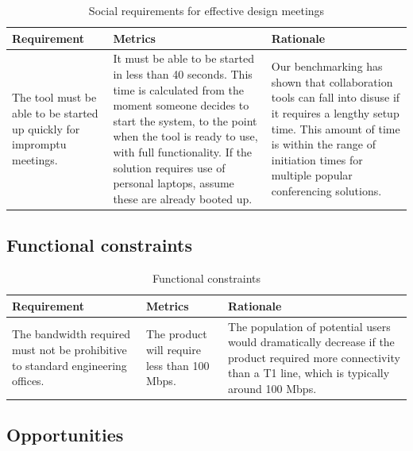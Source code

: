 \begin{table}[!h]
	\centering
		\begin{tabular}{| p{42mm} | p{42mm} | p{51mm} |}
		\hline
		\textbf{Requirement}	& \textbf{Metrics} & \textbf{Rationale} \\
		\hline
The tool must be able to be started up quickly for impromptu meetings.	& It must be able to be started in less than 40 seconds. This time is calculated from the moment someone decides to start the system, to the point when the tool is ready to use, with full functionality. If the solution requires use of personal laptops, assume these are already booted up. & Our benchmarking has shown that collaboration tools can fall into disuse if it requires a lengthy setup time. This amount of time is within the range of initiation times for multiple popular conferencing solutions. \\ \hline

	\end{tabular}
	\caption{Social requirements for effective design meetings}
	\label{tab:mediums3}
\end{table}



\newpage

\subsection{Functional constraints}

\begin{table}[!h]
	\centering
		\begin{tabular}{| p{44mm} | p{49mm} | p{42mm} |}
		\hline
		\textbf{Requirement}	& \textbf{Metrics} & \textbf{Rationale} \\
		\hline
		The bandwidth required must not be prohibitive to standard engineering offices.	& The product will require less than 100 Mbps.& The population of potential users would dramatically decrease if the product required more connectivity than a T1 line, which is typically around 100 Mbps.\\ \hline
			\end{tabular}
	\caption{Functional constraints}
	\label{tab:fconstraints}
\end{table}


\subsection{Opportunities}

